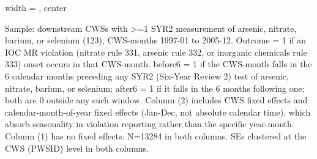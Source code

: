 \begin{table}[htbp]
\begin{adjustbox}{width = \textwidth, center}
      
      
   \end{adjustbox}
      {\tiny\linespread{1}\selectfont \par \raggedright 
   Sample: downstream CWSs with >=1 SYR2 measurement of arsenic, nitrate, barium, or selenium (123), CWS-months 1997-01 to 2005-12. Outcome = 1 if an IOC MR violation (nitrate rule 331, arsenic rule 332, or inorganic chemicals rule 333) onset occurs in that CWS-month. before6 = 1 if the CWS-month falls in the 6 calendar months preceding any SYR2 (Six-Year Review 2) test of arsenic, nitrate, barium, or selenium; after6 = 1 if it falls in the 6 months following one; both are 0 outside any such window. Column (2) includes CWS fixed effects and calendar-month-of-year fixed effects (Jan-Dec, not absolute calendar time), which absorb seasonality in violation reporting rather than the specific year-month. Column (1) has no fixed effects. N=13284 in both columns. SEs clustered at the CWS (PWSID) level in both columns.}
   
\end{table}


